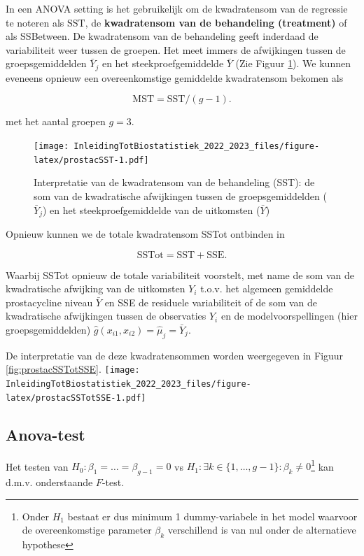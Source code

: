 \documentclass[
  12pt,dutch,coursenotes]{book}
\begin{document}
In een ANOVA setting is het gebruikelijk om de kwadratensom van de regressie te noteren als \(\text{SST}\), de \textbf{kwadratensom van de behandeling (treatment)} of als SSBetween.
De kwadratensom van de behandeling geeft inderdaad de variabiliteit weer tussen de groepen.
Het meet immers de afwijkingen tussen de groepsgemiddelden \(\bar Y_j\) en het steekproefgemiddelde \(\bar Y\) (Zie Figuur \ref{fig:prostacSST}).
We kunnen eveneens opnieuw een overeenkomstige gemiddelde kwadratensom bekomen als

\[\text{MST}=\text{SST}/(g-1).\]

met het aantal groepen \(g=3\).

\begin{figure}
\centering
\texttt{[image: InleidingTotBiostatistiek\_2022\_2023\_files/figure-latex/prostacSST-1.pdf]}
\caption{\label{fig:prostacSST}Interpretatie van de kwadratensom van de behandeling (SST): de som van de kwadratische afwijkingen tussen de groepsgemiddelden (\(\bar Y_j\)) en het steekproefgemiddelde van de uitkomsten (\(\bar Y\))}
\end{figure}

Opnieuw kunnen we de totale kwadratensom SSTot ontbinden in

\[\text{SSTot} = \text{SST} + \text{SSE}.\]

Waarbij SSTot opnieuw de totale variabiliteit voorstelt, met name de som van de kwadratische afwijking van de uitkomsten \(Y_{i}\) t.o.v. het algemeen gemiddelde prostacycline niveau \(\bar{Y}\) en SSE de residuele variabiliteit of de som van de kwadratische afwijkingen tussen de observaties \(Y_{i}\) en de modelvoorspellingen (hier groepsgemiddelden) \(\hat{g}(x_{i1},x_{i2})=\hat \mu_j=\bar Y_j\).

De interpretatie van de deze kwadratensommen worden weergegeven in Figuur \ref{fig:prostacSSTotSSE}.
\texttt{[image: InleidingTotBiostatistiek\_2022\_2023\_files/figure-latex/prostacSSTotSSE-1.pdf]}

\hypertarget{anova-test}{%
\subsection{Anova-test}\label{anova-test}}

Het testen van \(H_0: \beta_1=\ldots=\beta_{g-1}=0\) vs \(H_1: \exists k \in\{1,\ldots,g-1\} : \beta_k \neq0\)\footnote{Onder \(H_1\) bestaat er dus minimum 1 dummy-variabele in het model waarvoor de overeenkomstige parameter \(\beta_k\) verschillend is van nul onder de alternatieve hypothese} kan d.m.v. onderstaande \(F\)-test.
\end{document}
